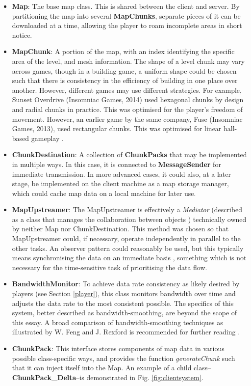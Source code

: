 \documentclass{scrartcl}
\begin{document}
\begin{itemize}
\item \textbf{Map}: The base map class. This is shared between the client and server. By partitioning the map into several \textbf{MapChunks}, separate pieces of it can be downloaded at a time, allowing the player to roam incomplete areas in short notice.
\item \textbf{MapChunk}: A portion of the map, with an index identifying the specific area of the level, and mesh information. The shape of a level chunk may vary across games, though in a building game, a uniform shape could be chosen such that there is consistency in the efficiency of building in one place over another. However, different games may use different strategies. For example, Sunset Overdrive (Insomniac Games, 2014) used hexagonal chunks by design and radial chunks in practice. This was optimised for the player's freedom of movement. However, an earlier game by the same company, Fuse (Insomniac Games, 2013), used rectangular chunks. This was optimised for linear hall-based gameplay \cite{overdrivegdc}.
\item \textbf{ChunkDestination}: A collection of \textbf{ChunkPacks} that may be implemented in multiple ways. In this case, it is connected to \textbf{MessageSender} for immediate transmission. In more advanced cases, it could also, at a later stage, be implemented on the client machine as a map storage manager, which could cache map data on a local machine for later use.
\item \textbf{MapUpstreamer}: The MapUpstreamer is effectively a \textit{Mediator} (described as a class that manages the collaboration between objects \cite{designpatterns}) technically owned by neither Map nor ChunkDestination. This method was chosen so that MapUpstreamer could, if necessary, operate independently in parallel to the other tasks. An observer pattern could reasonably be used, but this typically means synchronising the data on an immediate basis \cite{designpatterns}, something which is not necessary for the time-sensitive task of prioritising the data flow.
\item \textbf{BandwidthMonitor}: To achieve data rate consistency as likely desired by players (see Section \ref{player}), this class monitors bandwidth over time and adjusts the data rate to the most consistent possible. The specifics of this system, better described as bandwidth-smoothing, are beyond the scope of this essay. A broad comparison of bandwidth-smoothing techniques as illustrated by W. Feng and J. Rexford is recommended for further reading \cite{bandwidthsmoothing}.
\item \textbf{ChunkPack}: This interface stores components of map data in various possible class-specific ways, and provides the function \textit{generateChunk} such that it can inject itself into the Map. An example of a child class--\textbf{ChunkPack\_Delta}--is demonstrated in Fig. \ref{fig:clientsystem}.
\end{itemize}
\end{document}
